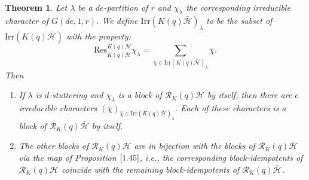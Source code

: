 \documentclass[10pt,a4paper,titlepage]{article}
\newtheorem{theorem}{Theorem}[section]
\newcommand{\el}{\lambda}
\begin{document}
\begin{theorem}\label{main result} Let $\el$ be a $de$-partition of $r$ and $\chi_\el$  the corresponding irreducible character of $G(de,1,r)$. We define $\mathrm{Irr}(K(q)\bar{\mathcal{H}})_\el$ to be the subset of $\mathrm{Irr}(K(q)\bar{\mathcal{H}})$ with the property:
$$\mathrm{Res}^{K(q)\mathcal{H}}_{K(q)\bar{\mathcal{H}}}\chi_\el=\sum_{\bar{\chi} \in \mathrm{Irr}(K(q)\bar{\mathcal{H}})_\el}\bar{\chi}.$$
Then
\begin{enumerate}
\item If $\el$ is $d$-stuttering and $\chi_\el$ is a block of $\mathcal{R}_K(q)\mathcal{H}$ by itself, then there are $e$ irreducible characters 
$(\bar{\chi})_{\bar{\chi} \in \mathrm{Irr}(K(q)\bar{\mathcal{H}})_\el}$. Each of these characters is a block of $\mathcal{R}_K(q)\bar{\mathcal{H}}$ by itself.
\item The other blocks of $\mathcal{R}_K(q)\mathcal{H}$ are in bijection with the blocks of  $\mathcal{R}_K(q)\bar{\mathcal{H}}$ via the map of Proposition $\ref{1.45}$, i.e., the corresponding block-idempotents of $\mathcal{R}_K(q)\mathcal{H}$ coincide with the remaining block-idempotents of $\mathcal{R}_K(q)\bar{\mathcal{H}}$.
\end{enumerate}
\end{theorem}
\end{document}
